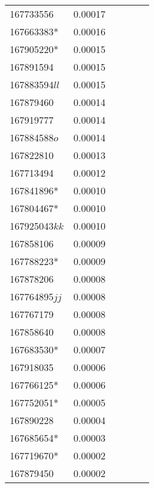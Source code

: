 \begin{landscape}
\begin{longtable}{p{1.8cm}p{0.9cm}p{2.2cm}p{1cm}p{2.8cm}p{13.4cm}}
167733556&0.00017&&&& \\
167663383*&0.00016&&&& \\
167905220*&0.00015&&&& \\
167891594&0.00015&&&& \\
167883594$ll$&0.00015&&&& \\
167879460&0.00014&&&& \\
167919777&0.00014&&&& \\
167884588$o$&0.00014&&&& \\
167822810&0.00013&&&& \\
167713494&0.00012&&&& \\
167841896*&0.00010&&&& \\
167804467*&0.00010&&&& \\
167925043$kk$&0.00010&&&& \\
167858106&0.00009&&&& \\
167788223*&0.00009&&&& \\
167878206&0.00008&&&& \\
167764895$jj$&0.00008&&&& \\
167767179&0.00008&&&& \\
167858640&0.00008&&&& \\
167683530*&0.00007&&&& \\
167918035&0.00006&&&& \\
167766125*&0.00006&&&& \\
167752051*&0.00005&&&& \\
167890228&0.00004&&&& \\
167685654*&0.00003&&&& \\
167719670*&0.00002&&&& \\
167879450&0.00002&&&& \\
\end{longtable}
\endgroup
\end{landscape}
